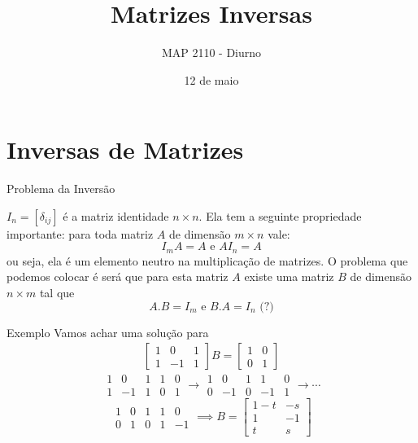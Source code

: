 \documentclass{beamer}
\title[Inversas]{Matrizes Inversas}
\author{MAP 2110 - Diurno}
\institute{IME USP}
\date{12 de maio}
\begin{document}
\begin{frame}
  \titlepage
\end{frame}



\section{Inversas de Matrizes}

\begin{frame}{Problema da Inversão}

  $I_n =[\delta_{ij}]$ é a matriz identidade $n\times n$. Ela tem a seguinte propriedade importante:
  para toda matriz $A$ de dimensão $m \times n$ vale:
  $$ I_m A = A \text{ e } AI_n =A $$ ou seja, ela é um elemento neutro na multiplicação de matrizes.
  O problema que podemos colocar é será que para esta matriz $A$ existe uma matriz $B$ de dimensão $n \times m$ tal que
  $$ A.B = I_m \text { e } B.A = I_n \text{ (?)}$$
  
 
\end{frame}

\begin{frame}{Exemplo}
  Vamos achar uma solução para
  \begin{gather*}
    \begin{bmatrix}
      1 & 0 & 1 \\
      1 & -1 & 1
    \end{bmatrix}B= \begin{bmatrix}
      1 & 0 \\ 0 & 1
    \end{bmatrix}
  \end{gather*}
  $$\begin{array}{|ccc|cc|} 
    1 & 0 & 1 & 1 & 0 \\
    1 & -1 & 1 & 0 & 1
  \end{array} \rightarrow 
  \begin{array}{|ccc|cc|} 
    1 & 0 & 1 & 1 & 0 \\
    0 & -1 & 0 & -1 & 1
  \end{array} \rightarrow \cdots
  $$
  $$\begin{array}{|ccc|cc|} 
    1 & 0 & 1 & 1 & 0 \\
    0 & 1 & 0 & 1 & -1
  \end{array} \implies B= \begin{bmatrix}
    1-t & -s \\ 1 & -1 \\ t & s
  \end{bmatrix} $$

  
\end{frame}
\end{document}
